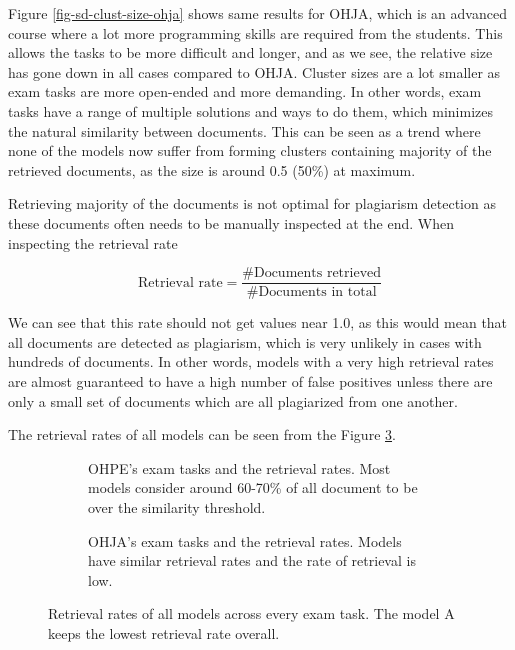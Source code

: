 Figure \ref{fig-sd-clust-size-ohja} shows same results for OHJA, which is an advanced course where a lot more programming skills are required from the students. This allows the tasks to be more difficult and longer, and as we see, the relative size has gone down in all cases compared to OHJA. Cluster sizes are a lot smaller as exam tasks are more open-ended and more demanding. In other words, exam tasks have a range of multiple solutions and ways to do them, which minimizes the natural similarity between documents. This can be seen as a trend where none of the models now suffer from forming clusters containing majority of the retrieved documents, as the size is around 0.5 (50\%) at maximum. 


Retrieving majority of the documents is not optimal for plagiarism detection as these documents often needs to be manually inspected at the end. When inspecting the retrieval rate \ie 

\begin{equation}
    \text{Retrieval rate} = \dfrac{\#\text{Documents retrieved}}{\#\text{Documents in total}}
\end{equation}

\noindent
We can see that this rate should not get values near 1.0, as this would mean that all documents are detected as plagiarism, which is very unlikely in cases with hundreds of documents. In other words, models with a very high retrieval rates are almost guaranteed to have a high number of false positives unless there are only a small set of documents which are all plagiarized from one another. 

The retrieval rates of all models can be seen from the Figure \ref{fig-sd-retrieval-rate}.

\begin{figure}[ht] 
  \centering
  \begin{subfigure}[b]{0.8\linewidth}
    \centering
    \setlength\figureheight{5cm}
    \setlength\figurewidth{\textwidth}
    
    \caption{OHPE's exam tasks and the retrieval rates. Most models consider around 60-70\% of all document to be over the similarity threshold.} 
    \label{fig-sd-retrieval-rate:a} 
    \vspace{1ex}
  \end{subfigure}
  
  \begin{subfigure}[b]{0.8\linewidth}
    \centering
    \setlength\figureheight{5cm}
    \setlength\figurewidth{\textwidth}
    
    \caption{OHJA's exam tasks and the retrieval rates. Models have similar retrieval rates and the rate of retrieval is low.} 
    \label{fig-sd-retrieval-rate:b} 
  \end{subfigure}
\caption{Retrieval rates of all models across every exam task. The model A keeps the lowest retrieval rate overall.}
\label{fig-sd-retrieval-rate}
\end{figure}

